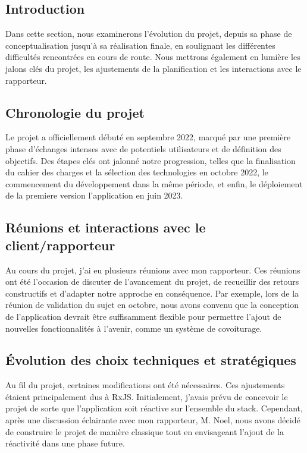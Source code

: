 \subsection{Introduction}\label{subsec:introduction2}
Dans cette section, nous examinerons l'évolution du projet, depuis sa phase de conceptualisation jusqu'à sa réalisation finale, en soulignant les différentes difficultés rencontrées en cours de route.
Nous mettrons également en lumière les jalons clés du projet, les ajustements de la planification et les interactions avec le rapporteur.

\subsection{Chronologie du projet}\label{subsec:chronologie-du-projet}
Le projet a officiellement débuté en septembre 2022, marqué par une première phase d'échanges intenses avec de potentiels utilisateurs et de définition des objectifs.
Des étapes clés ont jalonné notre progression, telles que la finalisation du cahier des charges et la sélection des technologies en octobre 2022,
le commencement du développement dans la même période, et enfin, le déploiement de la premiere version l'application en juin 2023.\\

\subsection{Réunions et interactions avec le client/rapporteur}\label{subsec:reunions-et-interactions-avec-le-client/rapporteur}
Au cours du projet, j'ai eu plusieurs réunions avec mon rapporteur.
Ces réunions ont été l'occasion de discuter de l'avancement du projet, de recueillir des retours constructifs et d'adapter notre approche en conséquence.
Par exemple, lors de la réunion de validation du sujet en octobre, nous avons convenu que la conception de l'application
devrait être suffisamment flexible pour permettre l'ajout de nouvelles fonctionnalités à l'avenir, comme un système de covoiturage.\\

\subsection{Évolution des choix techniques et stratégiques}\label{subsec:evolution-des-choix-techniques-et-strategiques}
Au fil du projet, certaines modifications ont été nécessaires.
Ces ajustements étaient principalement dus à RxJS. Initialement, j'avais prévu de concevoir le projet de sorte que l'application soit réactive sur l'ensemble du stack.
Cependant, après une discussion éclairante avec mon rapporteur, M. Noel,
nous avons décidé de construire le projet de manière classique tout en envisageant l'ajout de la réactivité dans une phase future.

